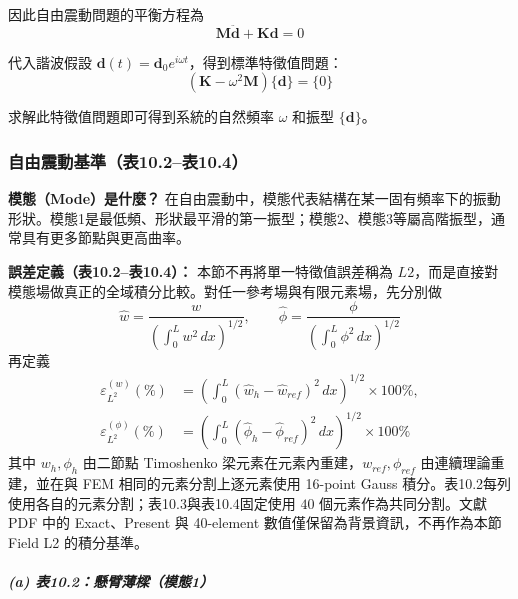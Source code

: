 ﻿\documentclass[UTF8, a4paper, 12pt]{ctexart}
\begin{document}
因此自由震動問題的平衡方程為
\begin{equation}
  \mathbf{M} \mathbf{\ddot{d}} + \mathbf{K} \mathbf{d} = 0
\end{equation}

代入諧波假設 $\mathbf{d}(t) = \mathbf{d}_0 e^{i\omega t}$，得到標準特徵值問題：
\begin{equation}
  (\mathbf{K} - \omega^2 \mathbf{M}) \{\mathbf{d}\} = \{0\}
\end{equation}

求解此特徵值問題即可得到系統的自然頻率 $\omega$ 和振型 $\{\mathbf{d}\}$。

\subsubsection{自由震動基準（表10.2--表10.4）}

\textbf{模態（Mode）是什麼？}
在自由震動中，模態代表結構在某一固有頻率下的振動形狀。模態1是最低頻、形狀最平滑的第一振型；模態2、模態3等屬高階振型，通常具有更多節點與更高曲率。

\textbf{誤差定義（表10.2--表10.4）：}
本節不再將單一特徵值誤差稱為 $L2$，而是直接對模態場做真正的全域積分比較。對任一參考場與有限元素場，先分別做
\begin{equation}
  \hat{w}=\frac{w}{\left(\int_0^L w^2\,dx\right)^{1/2}}, \qquad
  \hat{\phi}=\frac{\phi}{\left(\int_0^L \phi^2\,dx\right)^{1/2}}
\end{equation}
再定義
\begin{equation}
\begin{aligned}
  \varepsilon^{(w)}_{L^2}(\%)&=
  \left(\int_0^L (\hat{w}_h-\hat{w}_{ref})^2\,dx\right)^{1/2}\times 100\%, \\
  \varepsilon^{(\phi)}_{L^2}(\%)&=
  \left(\int_0^L (\hat{\phi}_h-\hat{\phi}_{ref})^2\,dx\right)^{1/2}\times 100\%
\end{aligned}
\end{equation}
其中 $w_h,\phi_h$ 由二節點 Timoshenko 梁元素在元素內重建，$w_{ref},\phi_{ref}$ 由連續理論重建，並在與 FEM 相同的元素分割上逐元素使用 16-point Gauss 積分。表10.2每列使用各自的元素分割；表10.3與表10.4固定使用 $40$ 個元素作為共同分割。文獻 PDF 中的 Exact、Present 與 40-element 數值僅保留為背景資訊，不再作為本節 Field L2 的積分基準。

\subparagraph{(a) 表10.2：懸臂薄樑（模態1）}
\end{document}
